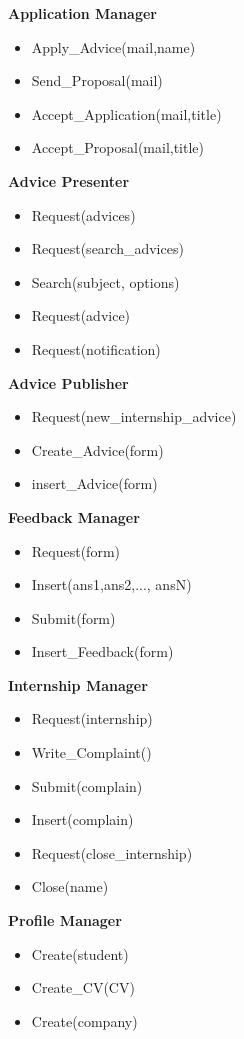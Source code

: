 		\textbf{Application Manager}
		\begin{itemize}
			\item Apply\_Advice(mail,name)
			\item Send\_Proposal(mail)
			\item Accept\_Application(mail,title)
			\item Accept\_Proposal(mail,title)
		\end{itemize}
		
		\textbf{Advice Presenter}
		\begin{itemize}
			\item Request(advices)
			\item Request(search\_advices)
			\item Search(subject, options)
			\item Request(advice)
			\item Request(notification)
		\end{itemize}
		
		\textbf{Advice Publisher}
		\begin{itemize}
			\item Request(new\_internship\_advice)
			\item Create\_Advice(form)
			\item insert\_Advice(form)
			
		\end{itemize}
		
		\textbf{Feedback Manager}
		\begin{itemize}
			\item Request(form)
			\item Insert(ans1,ans2,..., ansN)
			\item Submit(form)
			\item Insert\_Feedback(form)
		\end{itemize}
		
		\textbf{Internship Manager}
		\begin{itemize}
			\item Request(internship)
			\item Write\_Complaint()
			\item Submit(complain)
			\item Insert(complain)
			\item Request(close\_internship)
			\item Close(name)
		\end{itemize}
		
		\textbf{Profile Manager}
		\begin{itemize}
			\item Create(student)
			\item Create\_CV(CV)
			\item Create(company)
		\end{itemize}
		
